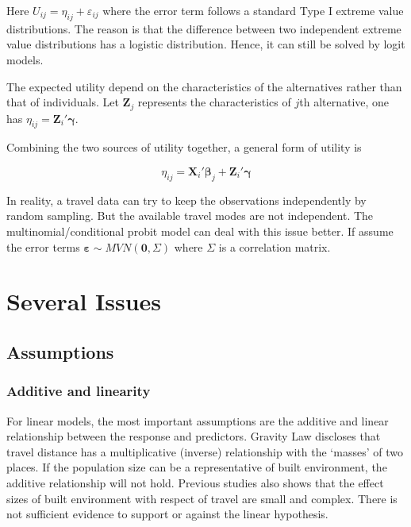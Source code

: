 \documentclass[
  11pt,
  openany]{memoir}
\begin{document}
Here \(U_{ij}=\eta_{ij}+\varepsilon_{ij}\) where the error term follows a standard Type I extreme value distributions. The reason is that the difference between two independent extreme value distributions has a logistic distribution. Hence, it can still be solved by logit models.

The expected utility depend on the characteristics of the alternatives rather than that of individuals.
Let \(\mathbf{Z}_j\) represents the characteristics of \(j\)th alternative, one has \(\eta_{ij}=\mathbf{Z}_i'\boldsymbol\gamma\).

Combining the two sources of utility together, a general form of utility is

\begin{equation}
\eta_{ij}=\mathbf{X}_i'\boldsymbol\beta_j+\mathbf{Z}_i'\boldsymbol\gamma
\end{equation}

In reality, a travel data can try to keep the observations independently by random sampling.
But the available travel modes are not independent.
The multinomial/conditional probit model can deal with this issue better.
If assume the error terms \(\boldsymbol\varepsilon\sim MVN(\mathbf{0},\Sigma)\) where \(\Sigma\) is a correlation matrix.

\hypertarget{several-issues}{%
\chapter{Several Issues}\label{several-issues}}

\hypertarget{assumptions}{%
\section{Assumptions}\label{assumptions}}

\hypertarget{additive-and-linearity}{%
\subsection{Additive and linearity}\label{additive-and-linearity}}

For linear models, the most important assumptions are the additive and linear relationship between the response and predictors. Gravity Law discloses that travel distance has a multiplicative (inverse) relationship with the `masses' of two places. If the population size can be a representative of built environment, the additive relationship will not hold. Previous studies also shows that the effect sizes of built environment with respect of travel are small and complex. There is not sufficient evidence to support or against the linear hypothesis.
\end{document}
